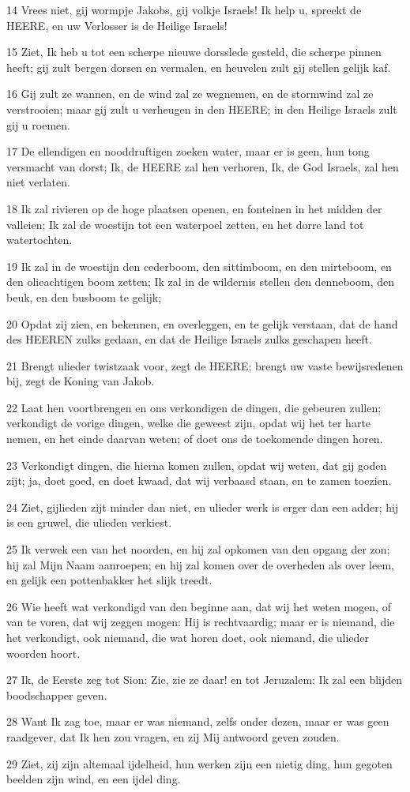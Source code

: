 \par 14 Vrees niet, gij wormpje Jakobs, gij volkje Israels! Ik help u, spreekt de HEERE, en uw Verlosser is de Heilige Israels!
\par 15 Ziet, Ik heb u tot een scherpe nieuwe dorsslede gesteld, die scherpe pinnen heeft; gij zult bergen dorsen en vermalen, en heuvelen zult gij stellen gelijk kaf.
\par 16 Gij zult ze wannen, en de wind zal ze wegnemen, en de stormwind zal ze verstrooien; maar gij zult u verheugen in den HEERE; in den Heilige Israels zult gij u roemen.
\par 17 De ellendigen en nooddruftigen zoeken water, maar er is geen, hun tong versmacht van dorst; Ik, de HEERE zal hen verhoren, Ik, de God Israels, zal hen niet verlaten.
\par 18 Ik zal rivieren op de hoge plaatsen openen, en fonteinen in het midden der valleien; Ik zal de woestijn tot een waterpoel zetten, en het dorre land tot watertochten.
\par 19 Ik zal in de woestijn den cederboom, den sittimboom, en den mirteboom, en den olieachtigen boom zetten; Ik zal in de wildernis stellen den denneboom, den beuk, en den busboom te gelijk;
\par 20 Opdat zij zien, en bekennen, en overleggen, en te gelijk verstaan, dat de hand des HEEREN zulks gedaan, en dat de Heilige Israels zulks geschapen heeft.
\par 21 Brengt ulieder twistzaak voor, zegt de HEERE; brengt uw vaste bewijsredenen bij, zegt de Koning van Jakob.
\par 22 Laat hen voortbrengen en ons verkondigen de dingen, die gebeuren zullen; verkondigt de vorige dingen, welke die geweest zijn, opdat wij het ter harte nemen, en het einde daarvan weten; of doet ons de toekomende dingen horen.
\par 23 Verkondigt dingen, die hierna komen zullen, opdat wij weten, dat gij goden zijt; ja, doet goed, en doet kwaad, dat wij verbaasd staan, en te zamen toezien.
\par 24 Ziet, gijlieden zijt minder dan niet, en ulieder werk is erger dan een adder; hij is een gruwel, die ulieden verkiest.
\par 25 Ik verwek een van het noorden, en hij zal opkomen van den opgang der zon; hij zal Mijn Naam aanroepen; en hij zal komen over de overheden als over leem, en gelijk een pottenbakker het slijk treedt.
\par 26 Wie heeft wat verkondigd van den beginne aan, dat wij het weten mogen, of van te voren, dat wij zeggen mogen: Hij is rechtvaardig; maar er is niemand, die het verkondigt, ook niemand, die wat horen doet, ook niemand, die ulieder woorden hoort.
\par 27 Ik, de Eerste zeg tot Sion: Zie, zie ze daar! en tot Jeruzalem: Ik zal een blijden boodschapper geven.
\par 28 Want Ik zag toe, maar er was niemand, zelfs onder dezen, maar er was geen raadgever, dat Ik hen zou vragen, en zij Mij antwoord geven zouden.
\par 29 Ziet, zij zijn altemaal ijdelheid, hun werken zijn een nietig ding, hun gegoten beelden zijn wind, en een ijdel ding.

